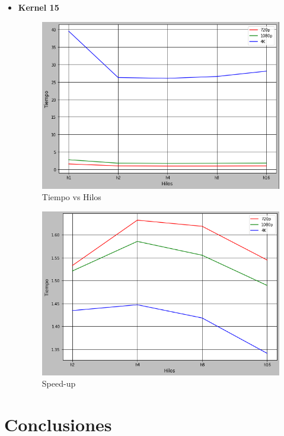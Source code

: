 \documentclass[a4paper,10pt]{IEEEtran}
\begin{document}
\begin{itemize}
    \item \textbf{Kernel 15} 
        \begin{figure}[H]
            \centering
            \includegraphics[scale = 0.3]{images/kF.png}
            \caption{Tiempo vs Hilos}
            \label{f06}
        \end{figure}{}
        
        \begin{figure}[H]
            \centering
            \includegraphics[scale = 0.3]{images/kFs.png}
            \caption{Speed-up}
            \label{f06a}
        \end{figure}{}
\end{itemize}{}

\section{Conclusiones}
\end{document}

